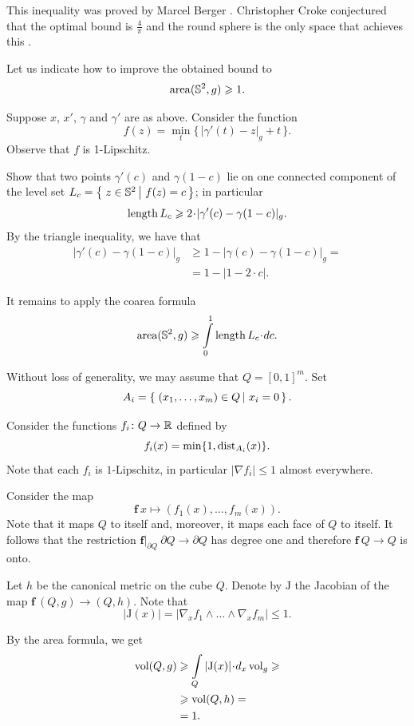 This inequality was proved by Marcel Berger \cite{berger}. 
Christopher Croke conjectured that the optimal bound is $\tfrac4\pi$ and the round sphere is the only space that achieves this \cite[see Conjecture 0.3 in][]{croke}.

Let us indicate how to improve the obtained bound to
\[\operatorname{\rm area}\nolimits(\mathbb{S}^2,g)\geqslant1.\]

Suppose $x$, $x'$, $\gamma$ and $\gamma'$ are as above.
Consider the function
\[f(z)=\min_t \{\,|\gamma'(t)-z|_g+t\,\}.\]
Observe that $f$ is 1-Lipschitz.

Show that two points $\gamma'(c)$ and $\gamma(1-c)$ lie on one connected component of the level set $L_c=\set{z\in\mathbb{S}^2}{f(z)=c}$;
in particular 
\[\length L_c\ge 2\cdot|\gamma'(c)-\gamma(1-c)|_g.\]
By the triangle inequality, we have that
\begin{align*}
|\gamma'(c)-\gamma(1-c)|_g&\ge 1-|\gamma(c)-\gamma(1-c)|_g=
\\
&=1-|1-2\cdot c|.
\end{align*}

It remains to apply the coarea formula
\[\area(\mathbb{S}^2,g)\ge \int\limits_0^1\length L_c\cdot dc.\]


Without loss of generality, we may assume that $Q=[0,1]^m$.
Set 
\[A_i=\set{(x_1,\dots,x_m)\in Q}{x_i=0}.\]

Consider the functions $f_i\colon Q\to\mathbb{R}$ defined by
$$f_i(x)=\min \{1,\operatorname{\rm dist}\nolimits_{A_i}(x)\}.$$
Note that each $f_i$ is $1$-Lipschitz, 
in particular $|\nabla f_i|\le 1$ almost everywhere.

Consider the map
\[\bm{f}\:x\mapsto(f_1(x),\dots,f_m(x)).\]
Note that it maps $Q$ to itself
and, moreover, it maps each face of $Q$ to itself.
It follows that the restriction $\bm{f}|_{\partial Q}\:\partial Q\to \partial Q$ has degree one and therefore 
$\bm{f}\:Q\to Q$ is onto.

Let $h$ be the canonical metric on the cube $Q$.
Denote by $\mathrm{J}$ the Jacobian of the map $\bm{f}\:(Q,g)\to (Q,h)$.
Note that 
\[|\mathrm{J}(x)|=|\nabla_x f_1\wedge\dots\wedge\nabla_xf_m|\le 1.\]

By the area formula, we get 
\begin{align*}
\vol(Q,g)
&\ge \int\limits_Q|\mathrm{J}(x)|\cdot d_x\vol_g\ge
\\
&\ge\vol(Q,h)=\\
&=1.
\end{align*}

